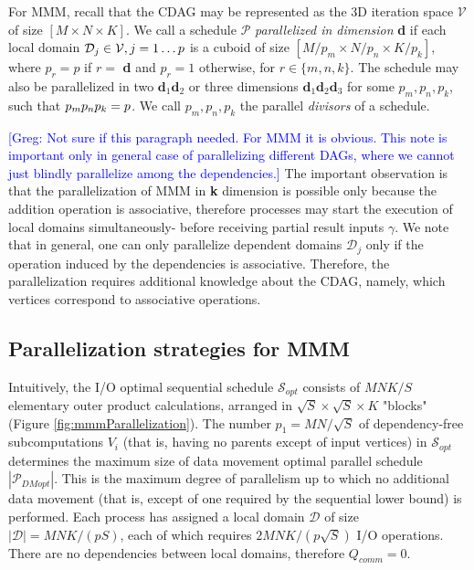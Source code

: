 \documentclass[sigplan,review,anonymous]{acmart}\settopmatter{printfolios=true,printccs=false,printacmref=false}
\newcommand\greg[1]{\textcolor{blue}{[Greg: #1]}}
\begin{document}
For MMM, recall that the CDAG may be represented as the 3D iteration space 
$\mathcal{V}$ of size $[M \times N \times K]$. We call a 
schedule $\mathcal{P}$ \emph{parallelized in dimension} \textbf{d} if each 
local domain $\mathcal{D}_j \in \mathcal{V}, j =\nobreak 1 \dots p$
is a cuboid of size $[M/p_m \times N/p_n \times K/p_k]$, where $p_r = 
p$ if $r 
= $ \textbf{d} and $p_r = 1$ otherwise, for $r \in \{m, n, k\}$. The schedule 
may also be parallelized in two $\mathbf{d}_1\mathbf{d}_2$ 
or three 
dimensions $\mathbf{d}_1\mathbf{d}_2\mathbf{d}_3$ for some $p_m, p_n, p_k$, 
such that $p_m p_n p_k= \nobreak p$. We call $p_m, p_n, p_k$ the parallel 
\emph{divisors} of a schedule.

\greg{Not sure if this paragraph needed. For MMM it is obvious. This note is 
important only in general case of parallelizing different DAGs, where we cannot 
just blindly parallelize among the dependencies.}
The important observation is that the parallelization of MMM in \textbf{k} 
dimension is possible only because the addition operation is associative, 
therefore processes may start the execution of local domains simultaneously- 
before receiving partial result inputs $\gamma$. We note that in general, one 
can only parallelize dependent domains $\mathcal{D}_j$ only if the operation 
induced by the dependencies is associative. Therefore, the parallelization 
requires additional knowledge about the CDAG, namely, which vertices correspond 
to associative operations.



\subsection{Parallelization strategies for MMM}
 Intuitively, the 
I/O optimal sequential schedule $\mathcal{S}_{opt}$
consists of $MNK/S$ elementary outer product calculations, arranged in
$\sqrt{S} \times \sqrt{S} \times K$ "blocks" (Figure
\ref{fig:mmmParallelization}). The number $p_1 = MN/\sqrt{S}$ of 
dependency-free subcomputations 
$V_i$
(that is, having no parents except of input vertices) in $\mathcal{S}_{opt}$ 
determines the maximum size of data movement optimal parallel schedule 
$|\mathcal{P}_{DMopt}|$. This is the maximum 
degree of parallelism up to which no
additional data movement (that is, except of one required by the sequential 
lower bound) is performed. Each process has assigned a local domain 
$\mathcal{D}$ of size 
$|\mathcal{D}| = MNK/(pS)$, each of which requires $2MNK/(p\sqrt{S})$ I/O 
operations. 
There are 
no dependencies between local domains, therefore $Q_{comm} = 0$.
\end{document}
